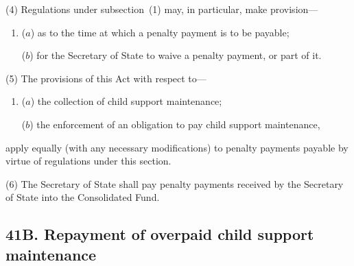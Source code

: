 \documentclass[12pt,a4paper]{article}
\begin{document}
(4) Regulations under subsection~(1)  may, in particular, make provision—
\begin{enumerate}\item[]
($a$) as to the time at which a penalty payment is to be payable;

($b$) for the 
Secretary of State  %
to waive a penalty payment, or part of it.
\end{enumerate}

(5) The provisions of this Act with respect to—
\begin{enumerate}\item[]
($a$) the collection of child support maintenance;

($b$) the enforcement of an obligation to pay child support maintenance,
\end{enumerate}
apply equally (with any necessary modifications) to penalty payments payable by virtue of regulations under this section.

(6) The 
Secretary of State  %
shall pay penalty payments received by 
the Secretary of State  %
into the Consolidated Fund.


\subsection{41B. Repayment of overpaid child support maintenance}
\end{document}
